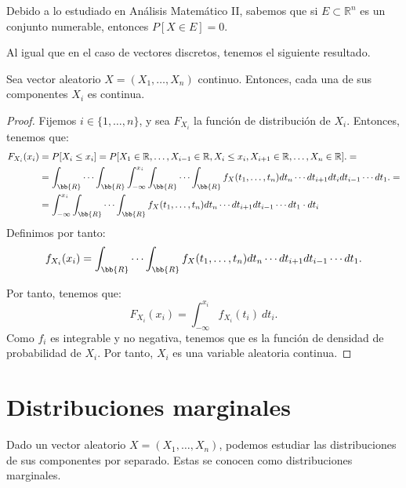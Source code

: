 Debido a lo estudiado en Análisis Matemático II, sabemos que si $E\subset \mathbb{R}^n$ es un conjunto numerable, entonces $P[X\in E] = 0$.


Al igual que en el caso de vectores discretos, tenemos el siguiente resultado.
\begin{teo} \label{teo:caract_cont}
    Sea vector aleatorio $X=(X_1, \ldots, X_n)$ continuo. Entonces, cada una de sus componentes $X_i$ es continua.
\end{teo}
\begin{proof}
    Fijemos $i\in \{1, \ldots, n\}$, y sea $F_{X_i}$ la función de distribución de $X_i$. Entonces, tenemos que:
    \begin{align*}
        F_{X_i}(x_i) &= P[X_i\leq x_i] = P[X_1\in \mathbb{R}, \ldots, X_{i-1}\in \mathbb{R}, X_i\leq x_i, X_{i+1}\in \mathbb{R}, \ldots, X_n\in \mathbb{R}].=\\
        &= \int_{\bb{R}} \cdots
        \int_{\bb{R}}\int_{-\infty}^{x_i}\int_{\bb{R}} \cdots
        \int_{\bb{R}}
        f_X(t_1, \ldots, t_n) d t_n \cdots dt_{i+1} dt_i dt_{i-1} \cdots dt_1.
        =\\
        &= \int_{-\infty}^{x_i}\int_{\bb{R}} \cdots
        \int_{\bb{R}}
        f_X(t_1, \ldots, t_n) d t_n \cdots dt_{i+1} dt_{i-1} \cdots dt_1 \cdot dt_i
    \end{align*}
    Definimos por tanto:
    \begin{equation*}
        f_{X_i}(x_i) = \int_{\bb{R}} \cdots
        \int_{\bb{R}}
        f_X(t_1, \ldots, t_n) d t_n \cdots dt_{i+1} dt_{i-1} \cdots dt_1.
    \end{equation*}


    Por tanto, tenemos que:
    \begin{equation*}
        F_{X_i}(x_i) = \int_{-\infty}^{x_i} f_{X_i}(t_i)~d t_i.
    \end{equation*}
    Como $f_i$ es integrable y no negativa, tenemos que es la función de densidad de probabilidad de $X_i$. Por tanto, $X_i$ es una variable aleatoria continua.
\end{proof}



\section{Distribuciones marginales}

Dado un vector aleatorio $X=(X_1, \ldots, X_n)$, podemos estudiar las distribuciones de sus componentes por separado. Estas se conocen como distribuciones marginales.

